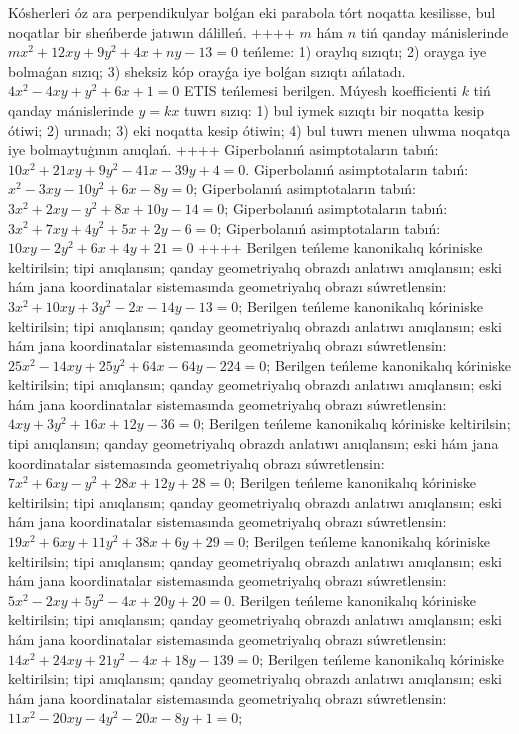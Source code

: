 Kósherleri óz ara perpendikulyar bolǵan eki parabola tórt noqatta kesilisse, bul noqatlar bir sheńberde jatıwın dálilleń.
++++
$m$ hám $n$ tiń qanday mánislerinde $m x^2+12 x y+9 y^2+4 x+n y-13=0$ teńleme: 1) oraylıq sızıqtı; 2) orayga iye bolmaǵan sızıq; 3) sheksiz kóp orayǵa iye bolǵan sızıqtı ańlatadı.
$4 x^2-4 x y+y^2+6 x+1=0$ ETIS teńlemesi berilgen. Múyesh koefficienti $k$ tiń qanday mánislerinde $y=kx$ tuwrı sızıq: 1) bul iymek sızıqtı bir noqatta kesip ótiwi; 2) urınadı; 3) eki noqatta kesip ótiwin; 4) bul tuwrı menen ulıwma noqatqa iye bolmaytuģının anıqlań.
++++
Giperbolanıń asimptotaların tabıń: $10 x^2+21 x y+9 y^2-41 x-39 y+4=0$.
Giperbolanıń asimptotaların tabıń: $x^2-3 x y-10 y^2+6 x-8 y=0$;
Giperbolanıń asimptotaların tabıń: $3 x^2+2 x y-y^2+8 x+10 y-14=0$;
Giperbolanıń asimptotaların tabıń: $3 x^2+7 x y+4 y^2+5 x+2 y-6=0$;
Giperbolanıń asimptotaların tabıń: $10 x y-2 y^2+6 x+4 y+21=0$
++++
Berilgen teńleme kanonikalıq kóriniske keltirilsin; tipi anıqlansın; qanday geometriyalıq obrazdı anlatıwı anıqlansın; eski hám jana koordinatalar sistemasında geometriyalıq obrazı súwretlensin: $3 x^2+10 x y+3 y^2-2 x-14 y-13=0$;
Berilgen teńleme kanonikalıq kóriniske keltirilsin; tipi anıqlansın; qanday geometriyalıq obrazdı anlatıwı anıqlansın; eski hám jana koordinatalar sistemasında geometriyalıq obrazı súwretlensin: $25 x^2-14 x y+25 y^2+64 x-64 y-224=0$;
Berilgen teńleme kanonikalıq kóriniske keltirilsin; tipi anıqlansın; qanday geometriyalıq obrazdı anlatıwı anıqlansın; eski hám jana koordinatalar sistemasında geometriyalıq obrazı súwretlensin: $4 x y+3 y^2+16 x+12 y-36=0$;
Berilgen teńleme kanonikalıq kóriniske keltirilsin; tipi anıqlansın; qanday geometriyalıq obrazdı anlatıwı anıqlansın; eski hám jana koordinatalar sistemasında geometriyalıq obrazı súwretlensin: $7 x^2+6 x y-y^2+28 x+12 y+28=0$;
Berilgen teńleme kanonikalıq kóriniske keltirilsin; tipi anıqlansın; qanday geometriyalıq obrazdı anlatıwı anıqlansın; eski hám jana koordinatalar sistemasında geometriyalıq obrazı súwretlensin: $19 x^2+6 x y+11 y^2+38 x+6 y+29=0$;
Berilgen teńleme kanonikalıq kóriniske keltirilsin; tipi anıqlansın; qanday geometriyalıq obrazdı anlatıwı anıqlansın; eski hám jana koordinatalar sistemasında geometriyalıq obrazı súwretlensin: $5 x^2-2 x y+5 y^2-4 x+20 y+20=0$.
Berilgen teńleme kanonikalıq kóriniske keltirilsin; tipi anıqlansın; qanday geometriyalıq obrazdı anlatıwı anıqlansın; eski hám jana koordinatalar sistemasında geometriyalıq obrazı súwretlensin: $14 x^2+24 x y+21 y^2-4 x+18 y-139=0$;
Berilgen teńleme kanonikalıq kóriniske keltirilsin; tipi anıqlansın; qanday geometriyalıq obrazdı anlatıwı anıqlansın; eski hám jana koordinatalar sistemasında geometriyalıq obrazı súwretlensin: $11 x^2-20 x y-4 y^2-20 x-8 y+1=0$;
